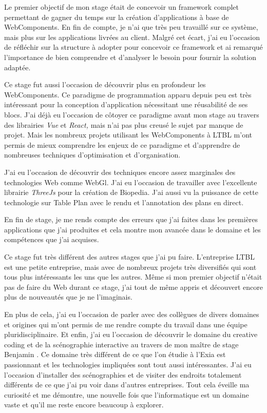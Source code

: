 \documentclass{article}
\begin{document}
    Le premier objectif de mon stage était de concevoir un framework complet permettant de gagner du temps sur la création d'applications à base de WebComponents.
    En fin de compte, je n'ai que très peu travaillé sur ce système, mais plus sur les applications livrées au client.
    Malgré cet écart, j'ai eu l'occasion de réfléchir sur la structure à adopter pour concevoir ce framework et ai remarqué l'importance de bien comprendre et d'analyser le besoin pour fournir la solution adaptée.

    Ce stage fut aussi l'occasion de découvrir plus en profondeur les WebComponents.
    Ce paradigme de programmation apparu depuis peu est très intéressant pour la conception d'application nécessitant une réusabilité de ses blocs.
    J'ai déjà eu l'occasion de côtoyer ce paradigme avant mon stage au travers des librairies \emph{Vue} et \emph{React,} mais n'ai pas plus creusé le sujet par manque de projet.
    Mais les nombreux projets utilisant les WebComponents à LTBL m'ont permis de mieux comprendre les enjeux de ce paradigme et d'apprendre de nombreuses techniques d'optimisation et d'organisation.

    J'ai eu l'occasion de découvrir des techniques encore assez marginales des technologies Web comme WebGl.
    J'ai eu l'occasion de travailler avec l'excellente librairie \emph{ThreeJs} pour la création de Biopedia.
    J'ai aussi vu la puissance de cette technologie sur Table Plan avec le rendu et l'annotation des plans en direct.

    En fin de stage, je me rends compte des erreurs que j'ai faites dans les premières applications que j'ai produites et cela montre mon avancée dans le domaine et les compétences que j'ai acquises.

    Ce stage fut très différent des autres stages que j'ai pu faire.
    L'entreprise LTBL est une petite entreprise, mais avec de nombreux projets très diversifiés qui sont tous plus intéressants les uns que les autres.
    Même si mon premier objectif n'était pas de faire du Web durant ce stage, j'ai tout de même appris et découvert encore plus de nouveautés que je ne l'imaginais.

    En plus de cela, j'ai eu l'occasion de parler avec des collègues de divers domaines et origines qui m'ont permis de me rendre compte du travail dans une équipe pluridisciplinaire.
    Et enfin, j'ai eu l'occasion de découvrir le domaine du creative coding et de la scénographie interactive au travers de mon maître de stage Benjamin .
    Ce domaine très différent de ce que l'on étudie à l'Exia est passionnant et les technologies impliquées sont tout aussi intéressantes.
    J'ai eu l'occasion d'installer des scénographies et de visiter des endroits totalement différents de ce que j'ai pu voir dans d'autres entreprises.
    Tout cela éveille ma curiosité et me démontre, une nouvelle fois que l'informatique est un domaine vaste et qu'il me reste encore beaucoup à explorer.
\end{document}
